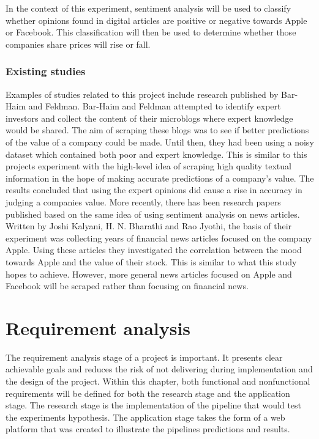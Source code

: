 \documentclass[a4paper,11pt]{report}
\begin{document}
In the context of this experiment, sentiment analysis will be used to classify whether opinions found in digital articles are positive or negative towards Apple or Facebook. This classification will then be used to determine whether those companies share prices will rise or fall.

\subsection{Existing studies}

Examples of studies related to this project include research published by Bar-Haim and Feldman. Bar-Haim and Feldman attempted to identify expert investors and collect the content of their microblogs where expert knowledge would be shared. The aim of scraping these blogs was to see if better predictions of the value of a company could be made.  Until then, they had been using a noisy dataset which contained both poor and expert knowledge. This is similar to this projects experiment with the high-level idea of scraping high quality textual information in the hope of making accurate predictions of a company's value. The results concluded that using the expert opinions did cause a rise in accuracy in judging a companies value. More recently, there has been research papers published based on the same idea of using sentiment analysis on news articles. Written by Joshi Kalyani, H. N. Bharathi and Rao Jyothi, the basis of their experiment was collecting years of financial news articles focused on the company Apple. Using these articles they investigated the correlation between the mood towards Apple and the value of their stock. This is similar to what this study hopes to achieve. However,  more general news articles focused on Apple and Facebook will be scraped rather than focusing on financial news.

\chapter{Requirement analysis}
\label{chap:requirement-anal}

The requirement analysis stage of a project is important. It presents clear achievable goals and reduces the risk of not delivering during implementation and the design of the project. Within this chapter, both functional and nonfunctional requirements will be defined for both the research stage and the application stage. The research stage is the implementation of the pipeline that would test the experiments hypothesis. The application stage takes the form of a web platform that was created to illustrate the pipelines predictions and results.
\end{document}
